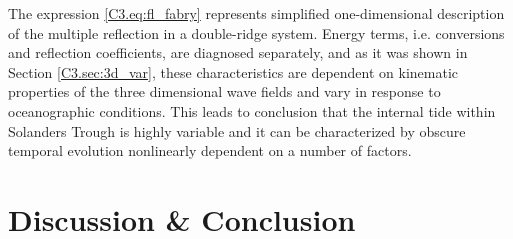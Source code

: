 \documentclass[12pt]{article}
\begin{document}
The expression \eqref{C3.eq:fl_fabry} represents simplified one-dimensional description of the 
multiple reflection in a double-ridge system. Energy terms, i.e. conversions and reflection 
coefficients, are diagnosed separately, and as it was shown in Section \ref{C3.sec:3d_var},  
these characteristics are dependent on kinematic properties of the three dimensional wave fields 
and vary in response to oceanographic conditions. This leads to conclusion that the internal tide 
within Solanders Trough is highly variable and it can be characterized by obscure temporal 
evolution nonlinearly dependent on a number of factors.

\newpage

%


\section{Discussion \& Conclusion}
\end{document}

